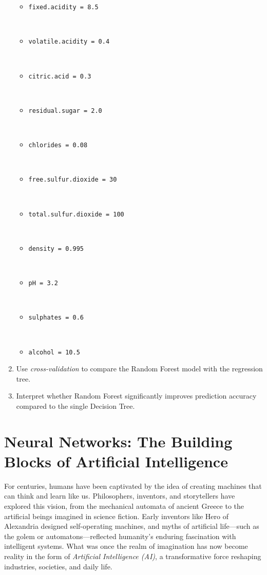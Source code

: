 \documentclass[
  11pt,
]{book}
\newcommand{\passthrough}[1]{#1}
\providecommand{\tightlist}{%
  \setlength{\itemsep}{0pt}\setlength{\parskip}{0pt}}
\theoremstyle{definition}
\theoremstyle{definition}
\theoremstyle{definition}
\theoremstyle{definition}
\theoremstyle{remark}
\begin{document}
\begin{enumerate}
  \begin{itemize}
  \tightlist
  \item
    \passthrough{\lstinline!fixed.acidity = 8.5!}\strut \\
  \item
    \passthrough{\lstinline!volatile.acidity = 0.4!}\strut \\
  \item
    \passthrough{\lstinline!citric.acid = 0.3!}\strut \\
  \item
    \passthrough{\lstinline!residual.sugar = 2.0!}\strut \\
  \item
    \passthrough{\lstinline!chlorides = 0.08!}\strut \\
  \item
    \passthrough{\lstinline!free.sulfur.dioxide = 30!}\strut \\
  \item
    \passthrough{\lstinline!total.sulfur.dioxide = 100!}\strut \\
  \item
    \passthrough{\lstinline!density = 0.995!}\strut \\
  \item
    \passthrough{\lstinline!pH = 3.2!}\strut \\
  \item
    \passthrough{\lstinline!sulphates = 0.6!}\strut \\
  \item
    \passthrough{\lstinline!alcohol = 10.5!}
  \end{itemize}
\item
  Use \emph{cross-validation} to compare the Random Forest model with the regression tree.\\
\item
  Interpret whether Random Forest significantly improves prediction accuracy compared to the single Decision Tree.
\end{enumerate}

\chapter{Neural Networks: The Building Blocks of Artificial Intelligence}\label{chapter-nn}

For centuries, humans have been captivated by the idea of creating machines that can think and learn like us. Philosophers, inventors, and storytellers have explored this vision, from the mechanical automata of ancient Greece to the artificial beings imagined in science fiction. Early inventors like Hero of Alexandria designed self-operating machines, and myths of artificial life---such as the golem or automatons---reflected humanity's enduring fascination with intelligent systems. What was once the realm of imagination has now become reality in the form of \emph{Artificial Intelligence (AI)}, a transformative force reshaping industries, societies, and daily life.
\end{document}
